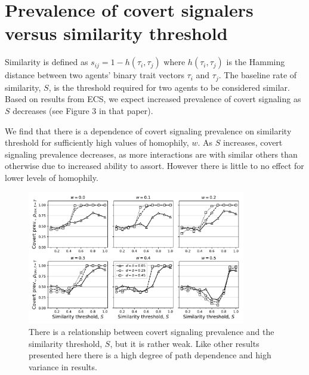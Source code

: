 \documentclass[11pt,letterpaper]{article}
\begin{document}
\section{Prevalence of covert signalers versus similarity threshold}

Similarity is defined as $s_{ij} = 1-h(\tau_i, \tau_j)$ where $h(\tau_i, \tau_j)$
is the Hamming distance between two agents' binary trait vectors $\tau_i$ and $\tau_j$.
The baseline rate of similarity, $S$, is the threshold required for two agents to
be considered similar. Based on results from ECS, we expect increased
prevalence of covert signaling as $S$ decreases (see Figure 3 in that paper).

We find that there is a dependence of covert signaling prevalence on similarity
threshold for sufficiently high values of homophily, $w$. As $S$
increases, covert signaling prevalence decreases, as more interactions are
with similar others than otherwise due to increased ability to assort. 
However there is little to no effect for lower levels of homophily.

\begin{figure}[H]
  \centering
    \includegraphics[width=0.85\textwidth]{Figures/similarity_threshold_matrix.pdf}
  \caption{There is a relationship between covert signaling prevalence and
  the similarity threshold, $S$, but it is rather weak. Like other results
  presented here there is a high degree of path dependence and high variance
  in results.}
  \label{fig:similarity}
\end{figure}
\end{document}
